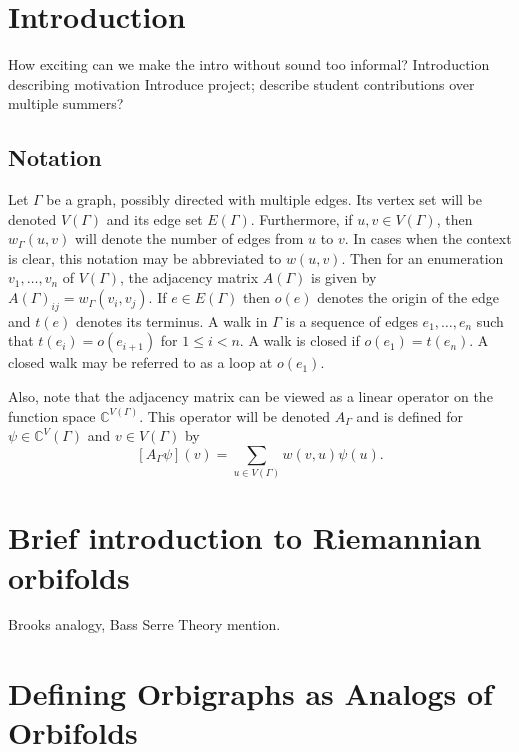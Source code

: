 \documentclass[12pt]{article}
\theoremstyle{plain}
\theoremstyle{definition}
\theoremstyle{remark}
\begin{document}
\section{Introduction}

  How exciting can we make the intro without sound too informal?
  Introduction describing motivation
  Introduce project; describe student contributions over multiple summers?

  

  \subsection{Notation}
  Let $\Gamma$ be a graph, possibly directed with multiple edges. Its vertex set will be denoted $V(\Gamma)$ and its edge set $E(\Gamma)$. Furthermore, if $u, v \in V(\Gamma)$, then $w_\Gamma(u, v)$ will denote the number of edges from $u$ to $v$. In cases when the context is clear, this notation may be abbreviated to $w(u,v)$. Then for an enumeration $v_1, \ldots, v_n$ of $V(\Gamma)$, the adjacency matrix $A(\Gamma)$ is given by $A(\Gamma)_{ij} = w_\Gamma(v_i, v_j)$. If $e \in E(\Gamma)$ then $o(e)$ denotes the origin of the edge and $t(e)$ denotes its terminus. A walk in $\Gamma$ is a sequence of edges $e_1,\ldots,e_n$ such that $t(e_i) = o(e_{i+1})$ for $1 \le i < n$. A walk is closed if $o(e_1) = t(e_n)$. A closed walk may be referred to as a loop at $o(e_1)$.

  Also, note that the adjacency matrix can be viewed as a linear operator on the function space $\mathbb{C}^{V(\Gamma)}$. This operator will be denoted $A_\Gamma$ and is defined for $\psi \in \mathbb{C}^V(\Gamma)$ and $v \in V(\Gamma)$ by
  $$
    [A_\Gamma \psi](v) = \sum_{u \in V(\Gamma)} w(v, u)\psi(u).
  $$


\section{Brief introduction to Riemannian orbifolds}

  Brooks analogy, Bass Serre Theory mention.


\section{Defining Orbigraphs as Analogs of Orbifolds}
\end{document}
